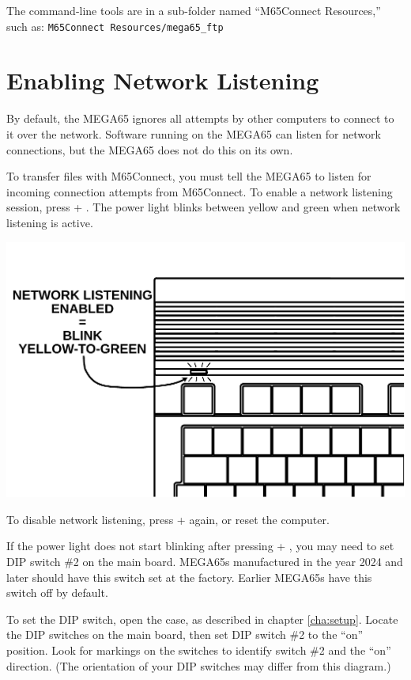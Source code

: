 The command-line tools are in a sub-folder named ``M65Connect Resources,'' such as: {\tt M65Connect Resources/mega65\_ftp}

\section{Enabling Network Listening}

By default, the MEGA65 ignores all attempts by other computers to connect to it over the network. Software running on the MEGA65 can listen for network connections, but the MEGA65 does not do this on its own.

To transfer files with M65Connect, you must tell the MEGA65 to listen for incoming connection attempts from M65Connect. To enable a network listening session, press  + \megakey{\pounds}. The power light blinks between yellow and green when network listening is active.

\begin{center}
\includegraphics[width=\linewidth]{images/illustrations/mega65-eth-blink.pdf}
\end{center}

To disable network listening, press  + \megakey{\pounds} again, or reset the computer.

If the power light does not start blinking after pressing  + \megakey{\pounds}, you may need to set DIP switch \#2 on the main board. MEGA65s manufactured in the year 2024 and later should have this switch set at the factory. Earlier MEGA65s have this switch off by default.

To set the DIP switch, open the case, as described in chapter \vref{cha:setup}. Locate the DIP switches on the main board, then set DIP switch \#2 to the ``on'' position. Look for markings on the switches to identify switch \#2 and the ``on'' direction. (The orientation of your DIP switches may differ from this diagram.)


